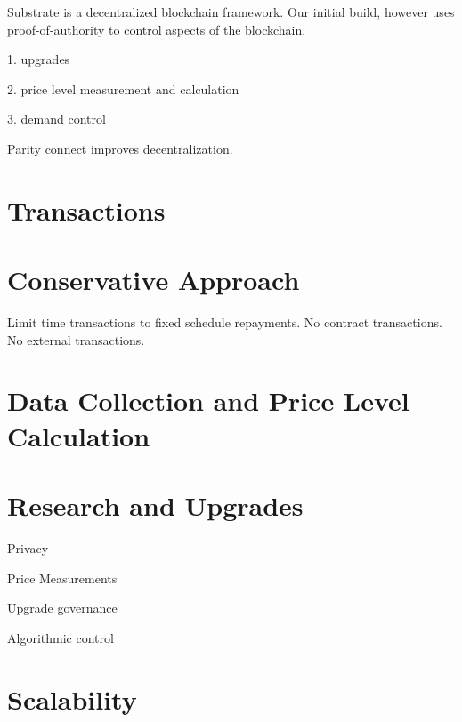 Substrate is a decentralized blockchain framework. Our initial build, however uses
proof-of-authority to control aspects of the blockchain.

1. upgrades

2. price level measurement and calculation

3. demand control

Parity connect improves decentralization.

\section{Transactions}

\section{Conservative Approach}

Limit time transactions to fixed schedule repayments. No contract transactions. No external
transactions.

\section{Data Collection and Price Level Calculation}

\section{Research and Upgrades}

Privacy

Price Measurements

Upgrade governance

Algorithmic control

\section{Scalability}




